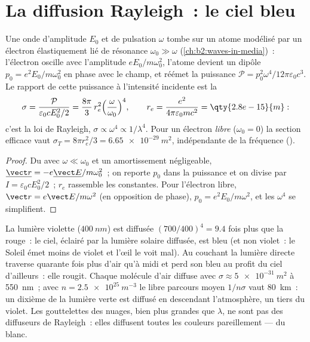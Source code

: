 \section{La diffusion Rayleigh~: le ciel bleu}

\begin{proposition}\label{prop:b2:dipole-radiation:rayleigh}
Une onde d'amplitude $E_0$ et de pulsation $\omega$ tombe sur un atome modélisé
par un électron élastiquement lié de résonance $\omega_0 \gg \omega$
(\cref{ch:b2:waves-in-media})~: l'électron oscille avec l'amplitude
$eE_0/m\omega_0^2$, l'atome devient un dipôle $p_0 = e^2E_0/m\omega_0^2$ en phase
avec le champ, et réémet la puissance $\mathcal P = p_0^2\omega^4/12\pi
\varepsilon_0c^3$. Le rapport de cette puissance à l'intensité incidente est la
\emph{}
\[
\sigma = \frac{\mathcal P}{\varepsilon_0cE_0^2/2} = \frac{8\pi}3\,r_e^2\Bigl(\frac\omega{\omega_0}\Bigr)^4 ,
\qquad r_e = \frac{e^2}{4\pi\varepsilon_0mc^2} = \qty{2.8e-15}{m} :
\]
c'est la loi de Rayleigh, $\sigma \propto \omega^4 \propto 1/\lambda^4$. Pour un électron
\emph{libre} ($\omega_0 = 0$) la section efficace vaut $\sigma_T = 8\pi r_e^2/3 =
\qty{6.65e-29}{m^2}$, indépendante de la fréquence ().
\end{proposition}

\begin{proof}
Du  avec $\omega \ll \omega_0$ et un amortissement négligeable,
$\underline{\vect r} = -e\underline{\vect E}/m\omega_0^2$~; on reporte $p_0$ dans la puissance et
on divise par $I = \varepsilon_0cE_0^2/2$~; $r_e$ rassemble les constantes. Pour l'électron
libre, $\vect r = e\vect E/m\omega^2$ (en opposition de phase), $p_0 = e^2E_0/m\omega^2$, et
les $\omega^4$ se simplifient.
\end{proof}

\begin{example}\label{ex:b2:dipole-radiation:sky}
La lumière violette ($\qty{400}{nm}$) est diffusée $(700/400)^4 = 9.4$ fois plus
que la rouge~: le ciel, éclairé par la lumière solaire diffusée, est bleu (et non violet~: le
Soleil émet moins de violet et l'œil le voit mal). Au couchant la lumière
directe traverse quarante fois plus d'air qu'à midi et perd son bleu au profit
du ciel d'ailleurs~: elle rougit. Chaque molécule d'air diffuse avec
$\sigma \approx \qty{5e-31}{m^2}$ à \qty{550}{nm}~; avec $n = \qty{2.5e25}{m^{-3}}$ le
libre parcours moyen $1/n\sigma$ vaut \qty{80}{km}~: un dixième de la lumière verte est
diffusé en descendant l'atmosphère, un tiers du
violet. Les gouttelettes des nuages, bien plus grandes que $\lambda$, ne sont pas des diffuseurs
de Rayleigh~: elles diffusent toutes les couleurs pareillement --- du blanc.
\end{example}

